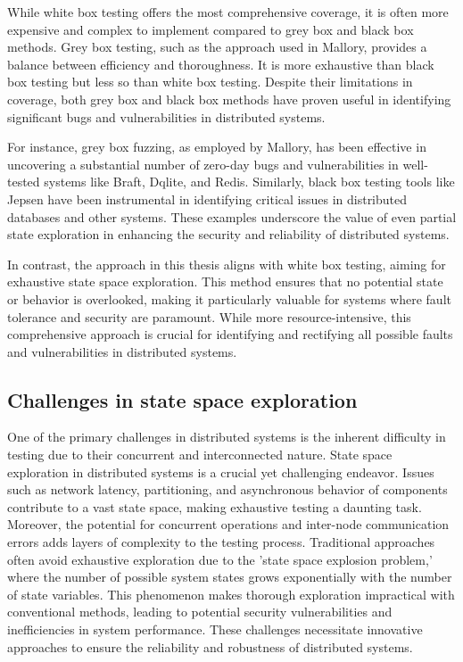 \documentclass[a4paper,11pt,oneside]{report}
\begin{document}
While white box testing offers the most comprehensive coverage, it is often more expensive and complex to implement compared to grey box and black box methods. Grey box testing, such as the approach used in Mallory, provides a balance between efficiency and thoroughness. It is more exhaustive than black box testing but less so than white box testing. Despite their limitations in coverage, both grey box and black box methods have proven useful in identifying significant bugs and vulnerabilities in distributed systems. 

For instance, grey box fuzzing, as employed by Mallory, has been effective in uncovering a substantial number of zero-day bugs and vulnerabilities in well-tested systems like Braft, Dqlite, and Redis. Similarly, black box testing tools like Jepsen have been instrumental in identifying critical issues in distributed databases and other systems. These examples underscore the value of even partial state exploration in enhancing the security and reliability of distributed systems.

In contrast, the approach in this thesis aligns with white box testing, aiming for exhaustive state space exploration. This method ensures that no potential state or behavior is overlooked, making it particularly valuable for systems where fault tolerance and security are paramount. While more resource-intensive, this comprehensive approach is crucial for identifying and rectifying all possible faults and vulnerabilities in distributed systems.

\subsection{Challenges in state space exploration}
One of the primary challenges in distributed systems is the inherent difficulty in testing due to their concurrent and interconnected nature. 
State space exploration in distributed systems is a crucial yet challenging endeavor.
Issues such as network latency, partitioning, and asynchronous behavior of components contribute to a vast state space, making exhaustive testing a daunting task. Moreover, the potential for concurrent operations and inter-node communication errors adds layers of complexity to the testing process. 
Traditional approaches often avoid exhaustive exploration due to the 'state space explosion problem,' where the number of possible system states grows exponentially with the number of state variables. This phenomenon makes thorough exploration impractical with conventional methods, leading to potential security vulnerabilities and inefficiencies in system performance.
These challenges necessitate innovative approaches to ensure the reliability and robustness of distributed systems. 
\end{document}
